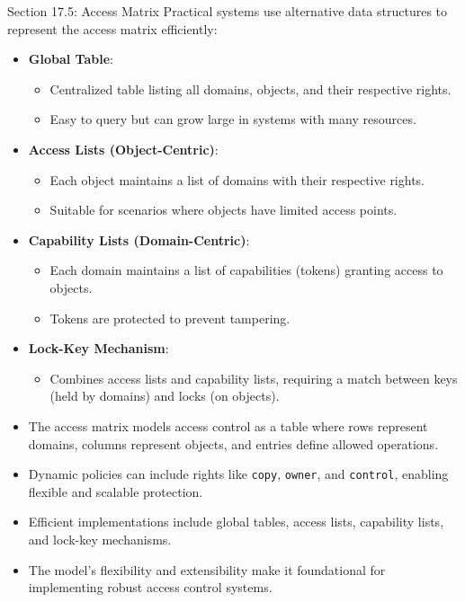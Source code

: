 \begin{notes}{Section 17.5: Access Matrix}
    Practical systems use alternative data structures to represent the access matrix efficiently:
    \begin{itemize}
        \item \textbf{Global Table}:
        \begin{itemize}
            \item Centralized table listing all domains, objects, and their respective rights.
            \item Easy to query but can grow large in systems with many resources.
        \end{itemize}
        \item \textbf{Access Lists (Object-Centric)}:
        \begin{itemize}
            \item Each object maintains a list of domains with their respective rights.
            \item Suitable for scenarios where objects have limited access points.
        \end{itemize}
        \item \textbf{Capability Lists (Domain-Centric)}:
        \begin{itemize}
            \item Each domain maintains a list of capabilities (tokens) granting access to objects.
            \item Tokens are protected to prevent tampering.
        \end{itemize}
        \item \textbf{Lock-Key Mechanism}:
        \begin{itemize}
            \item Combines access lists and capability lists, requiring a match between keys (held by domains) and locks (on objects).
        \end{itemize}
    \end{itemize}
    
    \begin{highlight}
        \begin{itemize}
            \item The access matrix models access control as a table where rows represent domains, columns represent objects, and entries define allowed operations.
            \item Dynamic policies can include rights like \texttt{copy}, \texttt{owner}, and \texttt{control}, enabling flexible and scalable protection.
            \item Efficient implementations include global tables, access lists, capability lists, and lock-key mechanisms.
            \item The model's flexibility and extensibility make it foundational for implementing robust access control systems.
        \end{itemize}
    \end{highlight}
\end{notes}

